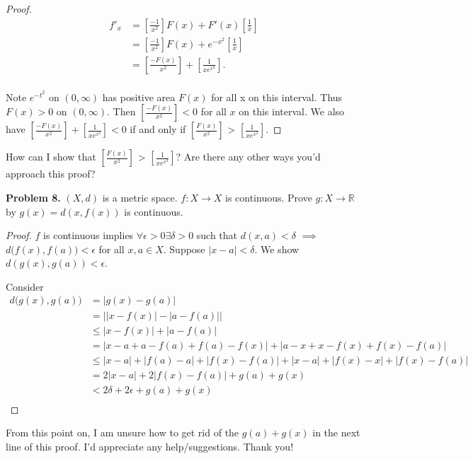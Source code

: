 \documentclass[12pt]{article}
\begin{document}
\begin{flushleft}
\begin{proof}
\begin{align*}
f'_{x} &= [\frac{-1}{x^{2}}]F(x) + F'(x)[\frac{1}{x}] \\
	&= [\frac{-1}{x^{2}}]F(x) + e^{-x^{2}}[\frac{1}{x}] \\
	&= [\frac{-F(x)}{x^{2}}] + [\frac{1}{xe^{x^{2}}}]. \\
\end{align*}

Note $e^{-t^{2}}$ on $(0, \infty)$ has positive area $F(x)$ for all x on this interval. Thus $F(x)>0$ on $(0, \infty)$. Then $[\frac{-F(x)}{x^{2}}]<0$ for all $x$ on this interval. We also have $[\frac{-F(x)}{x^{2}}] + [\frac{1}{xe^{x^{2}}}] < 0$ if and only if $[\frac{F(x)}{x^{2}}]$ > $[\frac{1}{xe^{x^{2}}}]$.

\end{proof}

\color{red} How can I show that $[\frac{F(x)}{x^{2}}]$ > $[\frac{1}{xe^{x^{2}}}]$? Are there any other ways you'd approach this proof? 

\vspace{.2cm}


\color{black}

\textbf{Problem 8.} $(X,d)$ is a metric space. $f: X \rightarrow X$ is continuous. Prove $g: X \rightarrow \mathbb{R}$ by $g(x)=d(x, f(x))$ is continuous. 

\begin{proof} 

$f$ is continuous implies $\forall \epsilon > 0 \exists \delta > 0$ such that $d(x,a)<\delta$ $\implies$ $d\big( f(x), f(a) \big) < \epsilon$ for all $x, a \in X$. Suppose $|x-a|<\delta$. We show $d(g(x),g(a))<\epsilon$. 

Consider 
\begin{align*} 
d\big(g(x),g(a)\big) &= |g(x)-g(a)| \\
			      &= \big| |x-f(x)| - |a-f(a)| \big| \\
			      &\leq |x-f(x)|+|a-f(a)| \\
			      &= |x-a+a-f(a)+f(a)-f(x)| + |a-x+x-f(x)+f(x)-f(a)| \\
			      &\leq |x-a| + |f(a)-a| + |f(x)-f(a)| + |x-a| + |f(x)-x| + |f(x)-f(a)| \\
			      &= 2|x-a| + 2|f(x)-f(a)| + g(a) + g(x) \\
			      &< 2\delta + 2\epsilon + g(a) + g(x) \\
\end{align*}
\end{proof}

\color{red} From this point on, I am unsure how to get rid of the $g(a) + g(x)$ in the next line of this proof. I'd appreciate any help/suggestions. Thank you!

\vspace{.2cm}

\color{black}
\end{flushleft}
\end{document}
